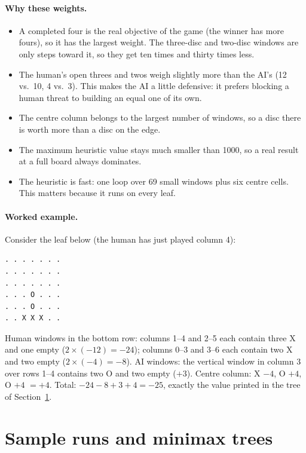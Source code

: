 \documentclass[11pt,a4paper]{article}
\begin{document}
\paragraph{Why these weights.}
\begin{itemize}
  \item A completed four is the real objective of the game (the winner has more fours),
  so it has the largest weight. The three-disc and two-disc windows are only steps toward
  it, so they get ten times and thirty times less.
  \item The human's open threes and twos weigh slightly more than the AI's (12 vs.\ 10,
  4 vs.\ 3). This makes the AI a little defensive: it prefers blocking a human threat to
  building an equal one of its own.
  \item The centre column belongs to the largest number of windows, so a disc there is
  worth more than a disc on the edge.
  \item The maximum heuristic value stays much smaller than 1000, so a real result at a
  full board always dominates.
  \item The heuristic is fast: one loop over 69 small windows plus six centre cells. This
  matters because it runs on every leaf.
\end{itemize}

\paragraph{Worked example.} Consider the leaf below (the human has just played column 4):
\begin{lstlisting}
. . . . . . .
. . . . . . .
. . . . . . .
. . . O . . .
. . . O . . .
. . X X X . .
\end{lstlisting}
Human windows in the bottom row: columns 1--4 and 2--5 each contain three X and one empty
($2\times(-12)=-24$); columns 0--3 and 3--6 each contain two X and two empty
($2\times(-4)=-8$). AI windows: the vertical window in column 3 over rows 1--4 contains two
O and two empty ($+3$). Centre column: X $-4$, O $+4$, O $+4$ $=+4$. Total:
$-24-8+3+4=-25$, exactly the value printed in the tree of Section~\ref{sec:samples}.

\section{Sample runs and minimax trees}\label{sec:samples}
\end{document}
